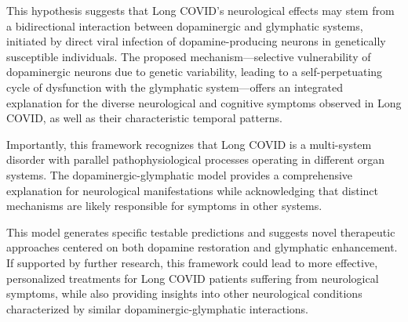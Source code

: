 \documentclass[12pt]{article}
\begin{document}
This hypothesis suggests that Long COVID's neurological effects may stem from a bidirectional interaction between dopaminergic and glymphatic systems, initiated by direct viral infection of dopamine-producing neurons in genetically susceptible individuals. The proposed mechanism—selective vulnerability of dopaminergic neurons due to genetic variability, leading to a self-perpetuating cycle of dysfunction with the glymphatic system—offers an integrated explanation for the diverse neurological and cognitive symptoms observed in Long COVID, as well as their characteristic temporal patterns.

Importantly, this framework recognizes that Long COVID is a multi-system disorder with parallel pathophysiological processes operating in different organ systems. The dopaminergic-glymphatic model provides a comprehensive explanation for neurological manifestations while acknowledging that distinct mechanisms are likely responsible for symptoms in other systems.

This model generates specific testable predictions and suggests novel therapeutic approaches centered on both dopamine restoration and glymphatic enhancement. If supported by further research, this framework could lead to more effective, personalized treatments for Long COVID patients suffering from neurological symptoms, while also providing insights into other neurological conditions characterized by similar dopaminergic-glymphatic interactions.



\end{document}
